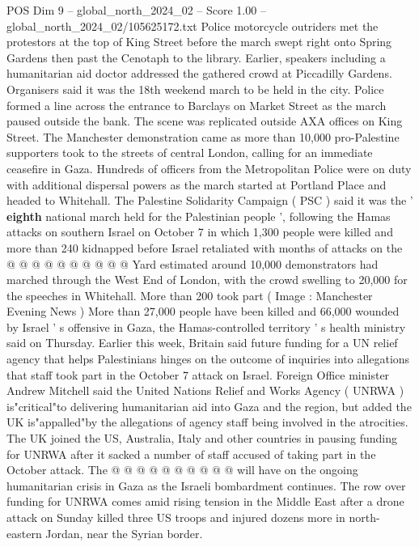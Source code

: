 \begin{textsample}{POS Dim 9 – global\_north\_2024\_02 – Score 1.00 – global\_north\_2024\_02/105625172.txt}  \label{ex:f9_pos_213}
Police motorcycle outriders met the protestors at the top of King Street before the march swept right onto Spring Gardens then past the Cenotaph to the library.
Earlier, speakers including a humanitarian aid doctor addressed the gathered crowd at Piccadilly Gardens.
Organisers said it was the 18th weekend march to be held in the city.
Police formed a line across the entrance to Barclays on Market Street as the march paused outside the bank.
The scene was replicated outside AXA offices on King Street.
The Manchester demonstration came as more than 10,000 pro-Palestine supporters took to the streets of central London, calling for an immediate ceasefire in Gaza.
Hundreds of officers from the Metropolitan Police were on duty with additional dispersal powers as the march started at Portland Place and headed to Whitehall.
The Palestine Solidarity Campaign ( PSC ) said it was the ' \textbf{eighth} national march held for the Palestinian people ', following the Hamas attacks on southern Israel on October 7 in which 1,300 people were killed and more than 240 kidnapped before Israel retaliated with months of attacks on the @ @ @ @ @ @ @ @ @ @ Yard estimated around 10,000 demonstrators had marched through the West End of London, with the crowd swelling to 20,000 for the speeches in Whitehall.
More than 200 took part ( Image : Manchester Evening News ) More than 27,000 people have been killed and 66,000 wounded by Israel ' s offensive in Gaza, the Hamas-controlled territory ' s health ministry said on Thursday.
Earlier this week, Britain said future funding for a UN relief agency that helps Palestinians hinges on the outcome of inquiries into allegations that staff took part in the October 7 attack on Israel.
Foreign Office minister Andrew Mitchell said the United Nations Relief and Works Agency ( UNRWA ) is"critical"to delivering humanitarian aid into Gaza and the region, but added the UK is"appalled"by the allegations of agency staff being involved in the atrocities.
The UK joined the US, Australia, Italy and other countries in pausing funding for UNRWA after it sacked a number of staff accused of taking part in the October attack.
The @ @ @ @ @ @ @ @ @ @ will have on the ongoing humanitarian crisis in Gaza as the Israeli bombardment continues.
The row over funding for UNRWA comes amid rising tension in the Middle East after a drone attack on Sunday killed three US troops and injured dozens more in north-eastern Jordan, near the Syrian border.

\end{textsample}
